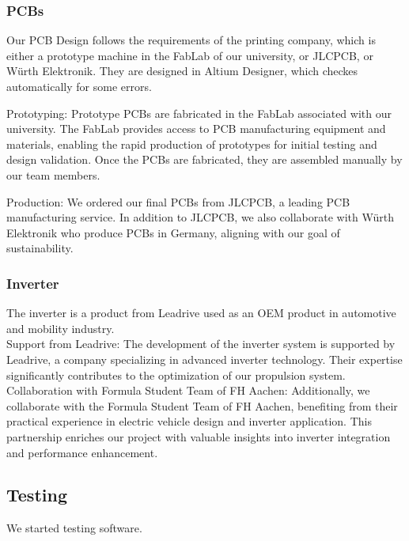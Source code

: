\subsubsection{PCBs}
Our PCB Design follows the requirements of the printing company, which is either a prototype machine in the FabLab of our university, or JLCPCB, or Würth Elektronik. They are designed in Altium Designer, which checkes automatically for some errors.
\par Prototyping: Prototype PCBs are fabricated in the FabLab associated with our university. The FabLab provides access to PCB manufacturing equipment and materials, enabling the rapid production of prototypes for initial testing and design validation.
    Once the PCBs are fabricated, they are assembled manually by our team members. 
\par Production: We ordered our final PCBs from JLCPCB, a leading PCB manufacturing service. In addition to JLCPCB, we also collaborate with Würth Elektronik who produce 
PCBs in Germany, aligning with our goal of sustainability.

\subsubsection{Inverter}
The inverter is a product from Leadrive used as an OEM product in automotive and mobility industry. \\

    Support from Leadrive: The development of the inverter system is supported by Leadrive, a company specializing in advanced inverter technology. Their expertise significantly contributes to the optimization of our propulsion system.
    Collaboration with Formula Student Team of FH Aachen: Additionally, we collaborate with the Formula Student Team of FH Aachen, benefiting from their practical experience in electric vehicle design and inverter application. This partnership enriches our project with valuable insights into inverter integration and performance enhancement.

\subsection{Testing}
We started testing software.

